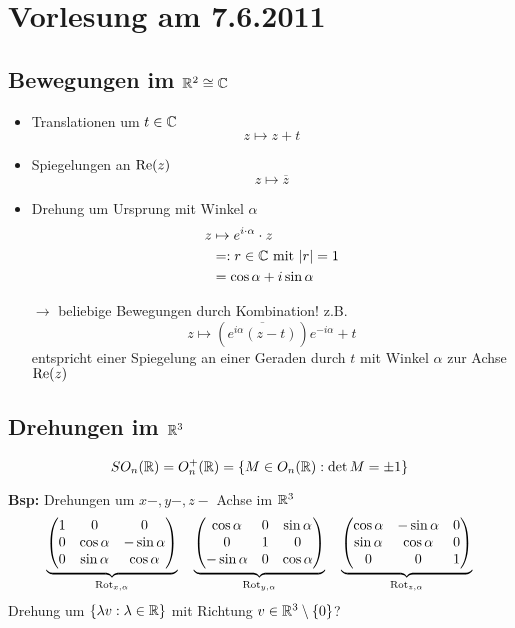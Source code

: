 \section*{Vorlesung am 7.6.2011} %
\label{sec:Vorlesung am 7.6.2011}

\subsection*{Bewegungen im $\mathbb R^2 \cong \mathbb C$} %

\begin{itemize}
	\item Translationen um $t \in \mathbb C$
	$$
		z \mapsto z+t
	$$
	\item Spiegelungen an $\operatorname{Re}(z)$
	$$
		z \mapsto \overline{z}
	$$
	\item Drehung um Ursprung mit Winkel $\alpha$
	\begin{align*}
		z & \mapsto e^{i \cdot \alpha} \cdot z\\
		& =: r \in \mathbb C \text{ mit } |r| = 1\\
		& = \cos \alpha + i \sin \alpha
	\end{align*}
	\item[$\to$] beliebige Bewegungen durch Kombination! z.B.
	$$
		z \mapsto \left( \overline{e^{i \alpha} (z-t)} \right) e^{-i \alpha} + t
	$$
	entspricht einer Spiegelung an einer Geraden durch $t$ mit Winkel $\alpha$ zur Achse $\operatorname{Re}(z)$
\end{itemize}


\subsection*{Drehungen im $\mathbb R^3$} %

$$
	SO_n(\mathbb R) = O_n^+(\mathbb R) = \left\{ M \in O_n(\mathbb R) : \det M = \pm 1 \right\}
$$

\textbf{Bsp:} Drehungen um $x-, y-, z-$ Achse im $\mathbb R^3$
$$
	\underbrace{
		\begin{pmatrix}
			1 & 0 & 0\\
			0 & \cos \alpha & - \sin \alpha\\
			0 & \sin \alpha & \cos \alpha
		\end{pmatrix}
	}_{\operatorname{Rot}_{x,\alpha}}
	\quad
	\underbrace{
		\begin{pmatrix}
			\cos \alpha & 0 & \sin \alpha\\
			0 & 1 & 0\\
			- \sin \alpha & 0 & \cos \alpha
		\end{pmatrix}
	}_{\operatorname{Rot}_{y,\alpha}}
	\quad
	\underbrace{
		\begin{pmatrix}
			\cos \alpha & - \sin \alpha & 0\\
			\sin \alpha & \cos \alpha & 0\\
			0 & 0 & 1
		\end{pmatrix}
	}_{\operatorname{Rot}_{z,\alpha}}
$$
Drehung um $\left\{ \lambda v : \lambda \in \mathbb R \right\}$ mit Richtung $v \in \mathbb R^3 \setminus \left\{
0 \right\}$?


